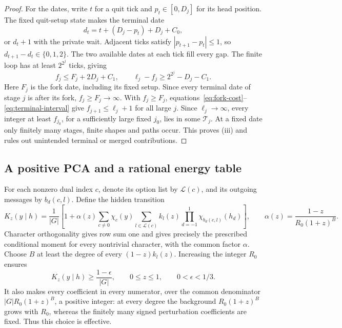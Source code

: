 \begin{proof}
For the dates, write \(t\) for a quit tick and \(p_t\in[0,D_j]\) for its head position. The fixed quit-setup state makes the terminal date
\[
 d_t=t+(D_j-p_t)+D_j+C_0,
\]
or \(d_t+1\) with the private wait. Adjacent ticks satisfy \(|p_{t+1}-p_t|\le1\), so \(d_{t+1}-d_t\in\{0,1,2\}\). The two available dates at each tick fill every gap. The finite loop has at least \(2^{2^j}\) ticks, giving
\begin{equation}\label{eq:terminal-interval}
 f_j\le F_j+2D_j+C_1,\qquad
 \ell_j-f_j\ge2^{2^j}-D_j-C_1.
\end{equation}
Here \(F_j\) is the fork date, including its fixed setup. Since every terminal date of stage \(j\) is after its fork, \(f_j\ge F_j\to\infty\). With \(f_j\ge F_j\), equations~\eqref{eq:fork-cost}--\eqref{eq:terminal-interval} give \(f_{j+1}\le\ell_j+1\) for all large \(j\). Since \(\ell_j\to\infty\), every integer at least \(f_{j_0}\), for a sufficiently large fixed \(j_0\), lies in some \(\mathcal T_j\). At a fixed date only finitely many stages, finite shapes and paths occur. This proves (iii) and rules out unintended terminal or merged contributions.
\end{proof}

\subsection{A positive PCA and a rational energy table}\label{sec:sign-magnet}

For each nonzero dual index \(c\), denote its option list by \(\mathcal L(c)\), and its outgoing messages by \(b_d(c,l)\). Define the hidden transition
\begin{equation}\label{eq:Fourier-kernel}
 K_z(y\mid h)=\frac1{|G|}\left[1+
 \alpha(z)\sum_{c\ne0}\chi_c(y)
 \sum_{l\in\mathcal L(c)}k_l(z)
 \prod_{d=-1}^1\chi_{b_d(c,l)}(h_d)\right],\qquad
 \alpha(z)=\frac{1-z}{R_0(1+z)^B}.
\end{equation}
Character orthogonality gives row sum one and gives precisely the prescribed conditional moment for every nontrivial character, with the common factor \(\alpha\). Choose \(B\) at least the degree of every \((1-z)k_l(z)\). Increasing the integer \(R_0\) ensures
\begin{equation}\label{eq:hidden-reset}
 K_z(y\mid h)\ge\frac{1-\epsilon}{|G|},\qquad
 0\le z\le1,\qquad 0<\epsilon<1/3.
\end{equation}
It also makes every coefficient in every numerator, over the common denominator \(|G|R_0(1+z)^B\), a positive integer: at every degree the background \(R_0(1+z)^B\) grows with \(R_0\), whereas the finitely many signed perturbation coefficients are fixed. Thus this choice is effective.

